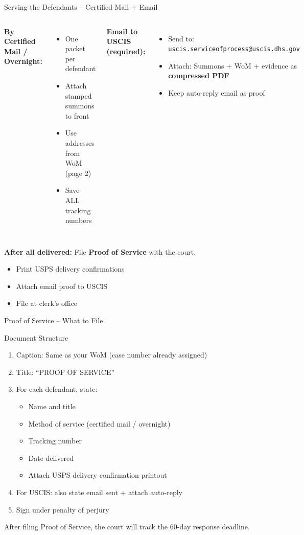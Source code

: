 \documentclass[10pt,aspectratio=169]{beamer}
\begin{document}
	\begin{frame}{Serving the Defendants – Certified Mail + Email}
		\begin{columns}[T]
			\textbf{By Certified Mail / Overnight:}
			\begin{itemize}
				\item One packet per defendant
				\item Attach stamped summons to front
				\item Use addresses from WoM (page 2)
				\item Save ALL tracking numbers
			\end{itemize}
			\textbf{Email to USCIS (required):}
			\begin{itemize}
				\item Send to: \texttt{uscis.serviceofprocess@uscis.dhs.gov}
				\item Attach: Summons + WoM + evidence as \textbf{compressed PDF}
				\item Keep auto-reply email as proof
			\end{itemize}
		\end{columns}
		\vspace{0.3cm}
		\textbf{After all delivered:} File \textbf{Proof of Service} with the court.
		\begin{itemize}
			\item Print USPS delivery confirmations
			\item Attach email proof to USCIS
			\item File at clerk’s office
		\end{itemize}
	\end{frame}
	
	\begin{frame}{Proof of Service – What to File}
		\begin{block}{Document Structure}
			\begin{enumerate}
				\item Caption: Same as your WoM (case number already assigned)
				\item Title: “PROOF OF SERVICE”
				\item For each defendant, state:
				\begin{itemize}
					\item Name and title
					\item Method of service (certified mail / overnight)
					\item Tracking number
					\item Date delivered
					\item Attach USPS delivery confirmation printout
				\end{itemize}
				\item For USCIS: also state email sent + attach auto-reply
				\item Sign under penalty of perjury
			\end{enumerate}
		\end{block}
		\tiny After filing Proof of Service, the court will track the 60-day response deadline.
	\end{frame}
	
\end{document}
